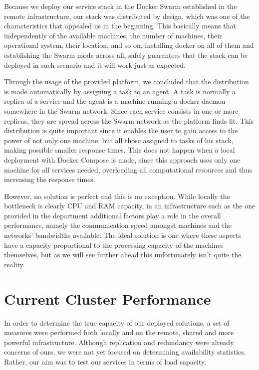 \documentclass[12pt]{article}
\begin{document}
Because we deploy our service stack in the Docker Swarm established in the remote infrastructure, our stack was distributed by design, which was one of the 
characteristics that appealed us in the beginning. 
This basically means that independently of the available machines, the number of machines, their operational system, their location, and so on, installing docker 
on all of them and establishing the Swarm mode across all, safely guarantees that the stack can be deployed in such scenario and it will work just as expected.

Through the usage of the provided platform, we concluded that the distribution is made automatically by assigning a task to an agent. 
A task is normally a replica of a service and the agent is a machine running a docker daemon somewhere in the Swarm network. 
Since each service consists in one or more replicas, they are spread across the Swarm network as the platform finds fit.
This distribution is quite important since it enables the user to gain access to the power of not only one machine, but all those assigned to tasks of his stack, 
making possible smaller response times. 
This does not happen when a local deployment with Docker Compose is made, since this approach uses only one machine for all services needed, overloading all 
computational resources and thus increasing the response times.

However, no solution is perfect and this is no exception.
While locally the bottleneck is clearly CPU and RAM capacity, in an infrastructure such as the one provided in the department additional factors play a role in 
the overall performance, namely the communication speed amongst machines and the networks' bandwidths available.
The ideal solution is one where these aspects have a capacity proportional to the processing capacity of the machines themselves, but as we will see further 
ahead this unfortunately isn't quite the reality.

\newpage
\section{Current Cluster Performance} \label{performance} %


In order to determine the true capacity of our deployed solutions, a set of measures were performed both locally and on the remote, shared and more powerful 
infrastructure.
Although replication and redundancy were already concerns of ours, we were not yet focused on determining availability statistics.
Rather, our aim was to test our services in terms of load capacity.
\end{document}

